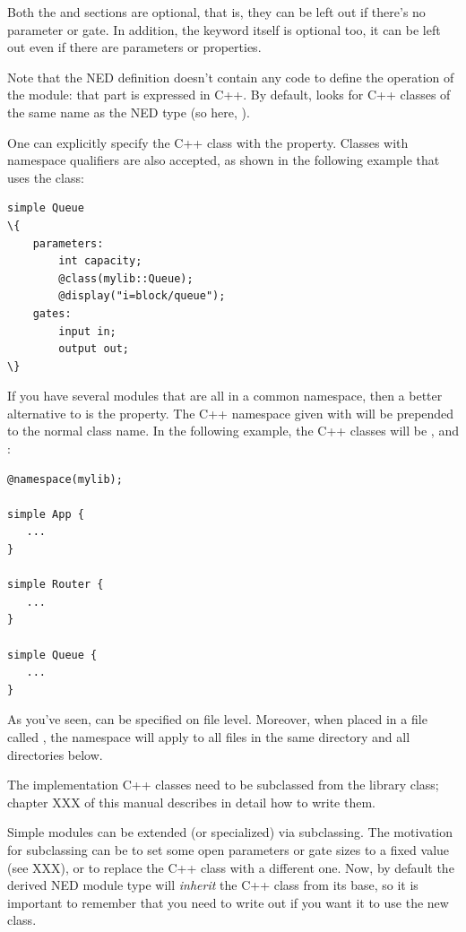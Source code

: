 Both the  and  sections are optional, that is,
they can be left out if there's no parameter or gate. In addition, the
 keyword itself is optional too, it can be left out
even if there are parameters or properties.

Note that the NED definition doesn't contain any code to define the
operation of the module: that part is expressed in C++. By default, {\opp}
looks for C++ classes of the same name as the NED type (so here, ).

One can explicitly specify the C++ class with the  property.
Classes with namespace qualifiers are also accepted, as shown in the following
example that uses the  class:

\begin{Verbatim}[commandchars=\\\{\}]
simple Queue
\{
    parameters:
        int capacity;
        @class(mylib::Queue);
        @display("i=block/queue");
    gates:
        input in;
        output out;
\}
\end{Verbatim}

If you have several modules that are all in a common namespace, then a
better alternative to  is the  property. The
C++ namespace given with  will be prepended to the normal
class name. In the following example, the C++ classes will be
,  and :

\begin{Verbatim}
@namespace(mylib);

simple App {
   ...
}

simple Router {
   ...
}

simple Queue {
   ...
}
\end{Verbatim}

As you've seen,  can be specified on file level. Moreover,
when placed in a file called , the namespace will apply to
all files in the same directory and all directories below.

The implementation C++ classes need to be subclassed from the
 library class; chapter XXX of this manual describes
in detail how to write them.

Simple modules can be extended (or specialized) via subclassing.
The motivation for subclassing can be to set some open parameters
or gate sizes to a fixed value (see XXX), or to replace the C++
class with a different one. Now, by default the derived NED module type
will \textit{inherit} the C++ class from its base, so it is important
to remember that you need to write out  if you want it
to use the new class.

